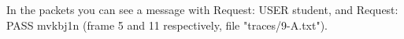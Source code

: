 In the packets you can see a message with Request: USER student, and Request: PASS mvkbj1n (frame 5 and 11 respectively, file "traces/9-A.txt").